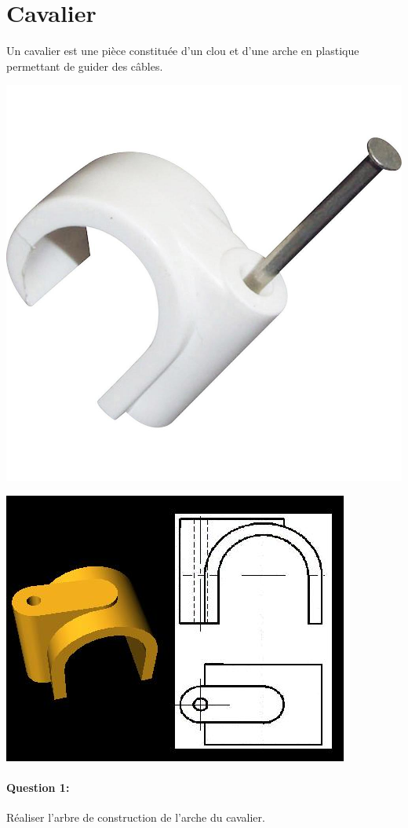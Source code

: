 \section{Cavalier}

Un cavalier est une pièce constituée d'un clou et d'une arche en plastique permettant de guider des câbles.

\begin{minipage}{0.4\linewidth}
 \includegraphics[width=0.9\linewidth]{img/cavalier1}
\end{minipage}\hfill
\begin{minipage}{0.55\linewidth}
 \includegraphics[width=0.9\linewidth]{img/cavalier2}
\end{minipage}

\paragraph{Question 1:} Réaliser l'arbre de construction de l'arche du cavalier.



